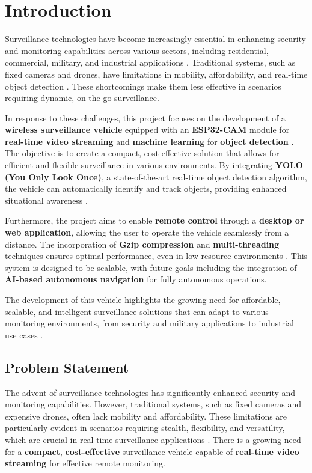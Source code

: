 \documentclass[12pt,a4paper]{report}
\begin{document}
	\label{Introduction}
	\section{Introduction}

Surveillance technologies have become increasingly essential in enhancing security and monitoring capabilities across various sectors, including residential, commercial, military, and industrial applications \cite{esp32cam}. Traditional systems, such as fixed cameras and drones, have limitations in mobility, affordability, and real-time object detection \cite{anymal}. These shortcomings make them less effective in scenarios requiring dynamic, on-the-go surveillance.

In response to these challenges, this project focuses on the development of a \textbf{wireless surveillance vehicle} equipped with an \textbf{ESP32-CAM} module for \textbf{real-time video streaming} and \textbf{machine learning} for \textbf{object detection} \cite{esp32cam}. The objective is to create a compact, cost-effective solution that allows for efficient and flexible surveillance in various environments. By integrating \textbf{YOLO (You Only Look Once)}, a state-of-the-art real-time object detection algorithm, the vehicle can automatically identify and track objects, providing enhanced situational awareness \cite{yolov10}.

Furthermore, the project aims to enable \textbf{remote control} through a \textbf{desktop or web application}, allowing the user to operate the vehicle seamlessly from a distance. The incorporation of \textbf{Gzip compression} and \textbf{multi-threading} techniques ensures optimal performance, even in low-resource environments \cite{homl}. This system is designed to be scalable, with future goals including the integration of \textbf{AI-based autonomous navigation} for fully autonomous operations.

The development of this vehicle highlights the growing need for affordable, scalable, and intelligent surveillance solutions that can adapt to various monitoring environments, from security and military applications to industrial use cases \cite{robotsearch}.


	\label{Problem Statement}
	\subsection{Problem Statement }
The advent of surveillance technologies has significantly enhanced security and monitoring capabilities. However, traditional systems, such as fixed cameras and expensive drones, often lack mobility and affordability. These limitations are particularly evident in scenarios requiring stealth, flexibility, and versatility, which are crucial in real-time surveillance applications \cite{robotsearch}. There is a growing need for a \textbf{compact}, \textbf{cost-effective} surveillance vehicle capable of \textbf{real-time video streaming} for effective remote monitoring.
\end{document}
